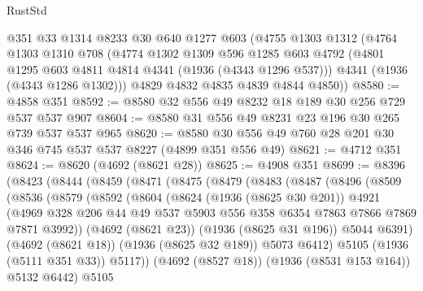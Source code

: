 \begin{lexlean}{RustStd}
\begin{coremodule}
    @351
    @33
    @1314
    @8233
    @30
    @640
    @1277
    @603
    (@4755
      @1303
      @1312
      (@4764
        @1303
        @1310
        @708
        (@4774
          @1302
          @1309
          @596
          @1285
          @603
          @4792
          (@4801 @1295 @603 @4811 @4814 @4341 (@1936 (@4343 @1296 @537)))
          @4341
          (@1936 (@4343 @1286 @1302)))
        @4829
        @4832
        @4835
        @4839
        @4844
        @4850))
@8580 := @4858 @351
@8592 := @8580 @32 @556 @49 @8232 @18 @189 @30 @256 @729 @537 @537 @907
@8604 := @8580 @31 @556 @49 @8231 @23 @196 @30 @265 @739 @537 @537 @965
@8620 := @8580 @30 @556 @49 @760 @28 @201 @30 @346 @745 @537 @537 @8227 (@4899 @351 @556 @49)
@8621 := @4712 @351
@8624 := @8620 (@4692 (@8621 @28))
@8625 := @4908 @351
@8699 := @8396
    (@8423
      (@8444
        (@8459
          (@8471
            (@8475
              (@8479
                (@8483
                  (@8487
                    (@8496
                      (@8509
                        (@8536
                          (@8579
                            (@8592
                              (@8604
                                (@8624
                                  (@1936 (@8625 @30 @201))
                                  @4921
                                  (@4969
                                    @328
                                    @206
                                    @44
                                    @49
                                    @537
                                    @5903
                                    @556
                                    @358
                                    @6354
                                    @7863
                                    @7866
                                    @7869
                                    @7871
                                    @3992))
                                (@4692 (@8621 @23))
                                (@1936 (@8625 @31 @196))
                                @5044
                                @6391)
                              (@4692 (@8621 @18))
                              (@1936 (@8625 @32 @189))
                              @5073
                              @6412)
                            @5105
                            (@1936 (@5111 @351 @33))
                            @5117))
                        (@4692 (@8527 @18))
                        (@1936 (@8531 @153 @164))
                        @5132
                        @6442)
                      @5105

\end{coremodule}
\end{lexlean}
